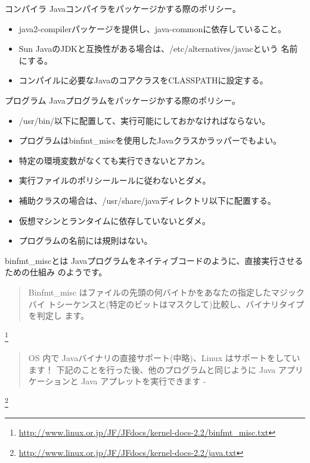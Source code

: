 \begin{frame}{コンパイラ}
Javaコンパイラをパッケージかする際のポリシー。\\
 \begin{itemize}
  \item java2-compilerパッケージを提供し、java-commonに依存していること。
  \item Sun JavaのJDKと互換性がある場合は、/etc/alternatives/javacという
	名前にする。
  \item コンパイルに必要なJavaのコアクラスをCLASSPATHに設定する。
 \end{itemize}
\end{frame}

\begin{frame}{プログラム}
Javaプログラムをパッケージかする際のポリシー。
 \begin{itemize}
  \item /usr/bin/以下に配置して、実行可能にしておかなければならない。
  \item プログラムはbinfmt\_miscを使用したJavaクラスかラッパーでもよい。
  \item 特定の環境変数がなくても実行できないとアカン。
  \item 実行ファイルのポリシールールに従わないとダメ。
  \item 補助クラスの場合は、/usr/share/javaディレクトリ以下に配置する。
  \item 仮想マシンとランタイムに依存していないとダメ。
  \item プログラムの名前には規則はない。
 \end{itemize}
\end{frame}

\begin{frame}{binfmt\_miscとは}
 Javaプログラムをネイティブコードのように、直接実行させるための仕組み
 のようです。
 \begin{quote}
  Binfmt\_misc はファイルの先頭の何バイトかをあなたの指定したマジックバイ
  トシーケンスと(特定のビットはマスクして)比較し、バイナリタイプを判定し
  ます。
 \end{quote}\footnote{\url{http://www.linux.or.jp/JF/JFdocs/kernel-docs-2.2/binfmt_misc.txt}}

 \begin{quote}
  OS 内で Javaバイナリの直接サポート(中略)、Linux はサポートをしています！
  下記のことを行った後、他のプログラムと同じように Java アプリケーションと
  Java アプレットを実行できます -
 \end{quote}\footnote{\url{http://www.linux.or.jp/JF/JFdocs/kernel-docs-2.2/java.txt}}
\end{frame}

